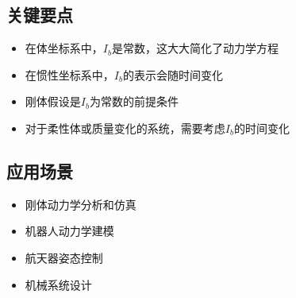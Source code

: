 \documentclass[12pt,a4paper]{article}
\begin{document}
\subsection{关键要点}

\begin{itemize}
\item 在体坐标系中，$I_b$是常数，这大大简化了动力学方程
\item 在惯性坐标系中，$I_b$的表示会随时间变化
\item 刚体假设是$I_b$为常数的前提条件
\item 对于柔性体或质量变化的系统，需要考虑$I_b$的时间变化
\end{itemize}

\subsection{应用场景}

\begin{itemize}
\item 刚体动力学分析和仿真
\item 机器人动力学建模
\item 航天器姿态控制
\item 机械系统设计
\end{itemize}
\end{document}
